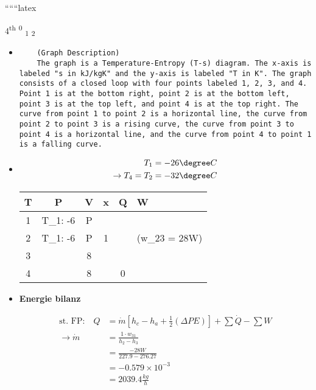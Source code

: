 
``````latex


4\textsuperscript{th} \textsuperscript{0} \textsubscript{1} \textsubscript{2}

\begin{itemize}
    \item[a)] 
    \begin{verbatim}
    (Graph Description)
    The graph is a Temperature-Entropy (T-s) diagram. The x-axis is labeled "s in kJ/kgK" and the y-axis is labeled "T in K". The graph consists of a closed loop with four points labeled 1, 2, 3, and 4. Point 1 is at the bottom right, point 2 is at the bottom left, point 3 is at the top left, and point 4 is at the top right. The curve from point 1 to point 2 is a horizontal line, the curve from point 2 to point 3 is a rising curve, the curve from point 3 to point 4 is a horizontal line, and the curve from point 4 to point 1 is a falling curve.
    \end{verbatim}
    
    \item[b)] 
    \begin{align*}
    T_1 &= -26 \degree C \\
    \rightarrow T_4 = T_2 &= -32 \degree C
    \end{align*}
    
    \begin{tabular}{c|c|c|c|c}
    T & P & V & x & Q & W \\
     & T_1: -6 & P & & & \\
    2 & T_1: -6 & P & 1 & & (w_{23} = 28W) \\
    3 & & 8 & & & \\
    4 & & 8 & & 0 & \\
    \end{tabular}
    
    \item[c)] 
    \textbf{Energie bilanz}
    
    \begin{align*}
    \text{st. FP:} \quad Q &= \dot{m} [h_c - h_a + \frac{1}{2} (\Delta PE)] + \sum \dot{Q} - \sum W \\
    \rightarrow \dot{m} &= \frac{1 \cdot w_{31}}{h_2 - h_3} \\
    &= \frac{-28W}{227.9 - 276.27} \\
    &= -0.579 \times 10^{-3} \\
    &= 2039.4 \frac{kg}{h}
    \end{align*}
    
    

\end{itemize}
